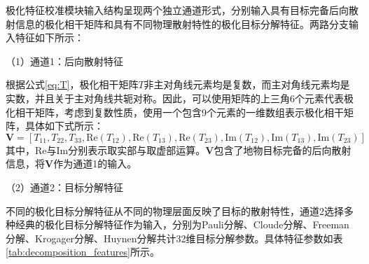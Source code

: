 极化特征校准模块输入结构呈现两个独立通道形式，分别输入具有目标完备后向散射信息的极化相干矩阵和具有不同物理散射特性的极化目标分解特征。两路分支输入特征如下所示：

（1）通道1：后向散射特征

根据公式\eqref{eq:T}，极化相干矩阵$T$非主对角线元素均是复数，而主对角线元素均是实数，并且关于主对角线共轭对称。因此，可以使用矩阵的上三角6个元素代表极化相干矩阵，考虑到复数性质，使用一个包含9个元素的一维数组表示极化相干矩阵，具体如下式所示：
\begin{equation}
    \textbf{V}=[T_{11}, T_{22}, T_{33}, \text{Re}(T_{12}), \text{Re}(T_{13}), \text{Re}(T_{23}), \text{Im}(T_{12}), \text{Im}(T_{13}), \text{Im}(T_{23})]
\end{equation}
其中，$\text{Re}$与$\text{Im}$分别表示取实部与取虚部运算。$\textbf{V}$包含了地物目标完备的后向散射信息，将$\textbf{V}$作为通道1的输入。

（2）通道2：目标分解特征

不同的极化目标分解特征从不同的物理层面反映了目标的散射特性，通道2选择多种经典的极化目标分解特征作为输入，分别为Pauli分解、Cloude分解、Freeman分解、Krogager分解、Huynen分解共计32维目标分解参数。具体特征参数如表\ref{tab:decomposition_features}所示。

